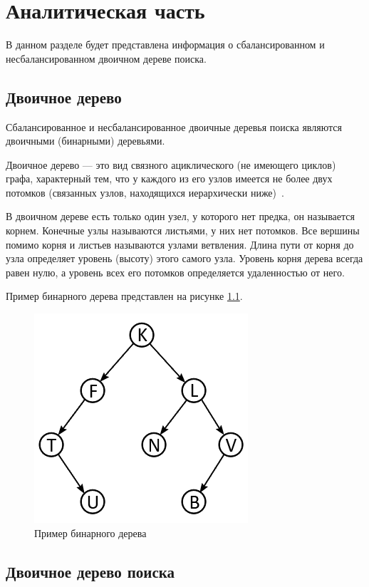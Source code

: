 \chapter{Аналитическая часть}
В данном разделе будет представлена информация о сбалансированном и несбалансированном двоичном дереве поиска.

\section{Двоичное дерево}

Сбалансированное и несбалансированное двоичные деревья поиска являются двоичными (бинарными) деревьями.

Двоичное дерево --- это вид связного ациклического (не имеющего циклов) графа, характерный тем, что у каждого из его узлов имеется не более двух потомков (связанных узлов, находящихся иерархически ниже)~\cite{algs}.

В двоичном дереве есть только один узел, у которого нет предка, он называется корнем.
Конечные узлы называются листьями, у них нет потомков.
Все вершины помимо корня и листьев называются узлами ветвления.
Длина пути от корня до узла определяет уровень (высоту) этого самого узла.
Уровень корня дерева всегда равен нулю, а уровень всех его потомков определяется удаленностью от него.

Пример бинарного дерева представлен на рисунке \ref{fig:binary_tree_example}.

\begin{figure}[h]
	\centering
	\includegraphics[height=0.3\textheight]{img/binary_tree.png}
	\caption{Пример бинарного дерева}
	\label{fig:binary_tree_example}
\end{figure}

\section{Двоичное дерево поиска}

